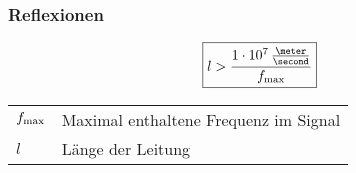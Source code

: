 \subsubsection{Reflexionen}

\begin{minipage}[c]{0.25\columnwidth}
    $$ \boxed{ l > \frac{1 \cdot 10^7 \, \frac{\meter}{\second} }{f_{\rm max}} } $$
\end{minipage}\hfill
\begin{minipage}[c]{0.79\columnwidth}
    \begin{tabular}{ll}
        $f_{\rm max}$&Maximal enthaltene Frequenz im Signal \\
        $l$         &Länge der Leitung 
    \end{tabular}
\end{minipage}

